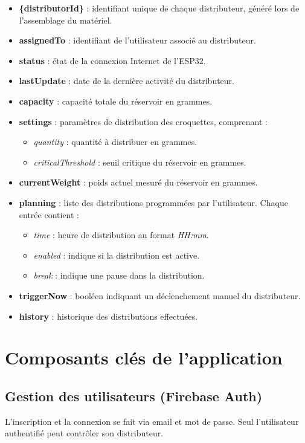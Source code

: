 \begin{enumerate}[label=\alph*)]
\begin{itemize}
\item \textbf{\{distributorId\}} : identifiant unique de chaque distributeur, généré lors de l'assemblage du matériel.
\item \textbf{assignedTo} : identifiant de l'utilisateur associé au distributeur.
\item \textbf{status} : état de la connexion Internet de l'ESP32.
\item \textbf{lastUpdate} : date de la dernière activité du distributeur.
\item \textbf{capacity} : capacité totale du réservoir en grammes.
\item \textbf{settings} : paramètres de distribution des croquettes, comprenant :
  \begin{itemize}
    \item \textit{quantity} : quantité à distribuer en grammes.
    \item \textit{criticalThreshold} : seuil critique du réservoir en grammes.
  \end{itemize}
\item \textbf{currentWeight} : poids actuel mesuré du réservoir en grammes.
\item \textbf{planning} : liste des distributions programmées par l'utilisateur. Chaque entrée contient :
  \begin{itemize}
    \item \textit{time} : heure de distribution au format \textit{HH:mm}.
    \item \textit{enabled} : indique si la distribution est active.
    \item \textit{break} : indique une pause dans la distribution.
  \end{itemize}
\item \textbf{triggerNow} : booléen indiquant un déclenchement manuel du distributeur.
\item \textbf{history} : historique des distributions effectuées.
\end{itemize}



\end{enumerate}

\section{Composants clés de l’application} 

\subsection{Gestion des utilisateurs (Firebase Auth)}
L'inscription et la connexion se fait via email et mot de passe. Seul l’utilisateur authentifié peut contrôler son distributeur.

